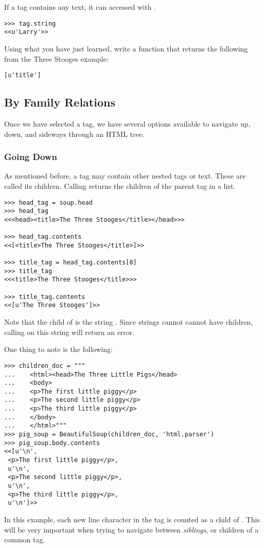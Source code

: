 If a tag contains any text, it can accessed with .
\begin{lstlisting}
>>> tag.string
<<u'Larry'>>
\end{lstlisting}

\begin{problem}
Using what you have just learned, write a function that returns the following from the Three Stooges example:
\begin{lstlisting}
[u'title']
\end{lstlisting}
\end{problem}

\subsection*{By Family Relations}

Once we have selected a tag, we have several options available to navigate up, down, and sideways through an HTML tree.

\subsubsection{Going Down}

As mentioned before, a tag may contain other nested tags or text. These are called its children.
Calling  returns the children of the parent tag in a list.
\begin{lstlisting}
>>> head_tag = soup.head
>>> head_tag
<<<head><title>The Three Stooges</title></head>>>

>>> head_tag.contents
<<[<title>The Three Stooges</title>]>>

>>> title_tag = head_tag.contents[0]
>>> title_tag
<<<title>The Three Stooges</title>>>

>>> title_tag.contents
<<[u'The Three Stooges']>>
\end{lstlisting}
Note that the child of  is the string . 
Since strings cannot cannot have children, calling  on this string will return an error.

\begin{info}
One thing to note is the following:
\begin{lstlisting}
>>> children_doc = """
...    <html><head>The Three Little Pigs</head>
...    <body>
...    <p>The first little piggy</p>
...    <p>The second little piggy</p>
...    <p>The third little piggy</p>
...    </body>
...    </html>"""
>>> pig_soup = BeautifulSoup(children_doc, 'html.parser')
>>> pig_soup.body.contents
<<[u'\n',
 <p>The first little piggy</p>,
 u'\n',
 <p>The second little piggy</p>,
 u'\n',
 <p>The third little piggy</p>,
 u'\n']>>
\end{lstlisting}
In this example, each new line character in the  tag is counted as a child of .
This will be very important when trying to navigate between \textit{siblings}, or children of a common tag.
\end{info}

